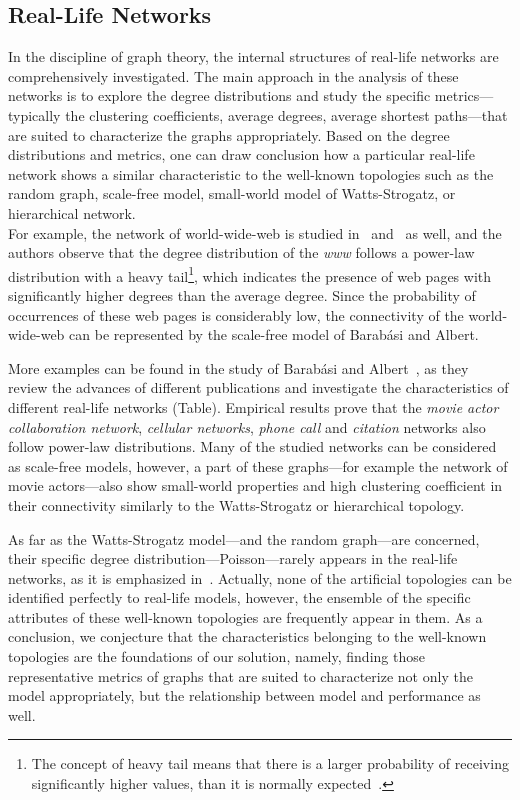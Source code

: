 \subsection{Real-Life Networks}

In the discipline of graph theory, the internal structures of real-life networks are comprehensively investigated. The main approach in the analysis of these networks is to explore the degree distributions and study the specific metrics---typically the clustering coefficients, average degrees, average shortest paths---that are suited to characterize the graphs appropriately. Based on the degree distributions and metrics, one can draw conclusion how a particular real-life network shows a similar characteristic to the well-known topologies such as the random graph, scale-free model, small-world model of Watts-Strogatz, or hierarchical network.\\
For example, the network of world-wide-web is studied in~\cite{www1} and~\cite{www2} as well, and the authors observe that the degree distribution of the \textit{www} follows a power-law distribution with a heavy tail\footnote{The concept of heavy tail means that there is a larger probability of receiving significantly higher values, than it is normally expected~\cite{heavy_tail}.}, which indicates the presence of web pages with significantly higher degrees than the average degree. Since the probability of occurrences of these web pages is considerably low, the connectivity of the world-wide-web can be represented by the scale-free model of Barabási and Albert.


More examples can be found in the study of Barabási and Albert~\cite{statistical_mechanics}, as they review the advances of different publications and investigate the characteristics of different real-life networks (Table). Empirical results prove that the \textit{movie actor collaboration network}, \textit{cellular networks}, \textit{phone call} and \textit{citation} networks also follow power-law distributions. Many of the studied networks can be considered as scale-free models, however, a part of these graphs---for example the network of movie actors---also show small-world properties and high clustering coefficient in their connectivity similarly to the Watts-Strogatz or hierarchical topology.

As far as the Watts-Strogatz model---and the random graph---are concerned, their specific degree distribution---Poisson---rarely appears in the real-life networks, as it is emphasized in~\cite{random_study}. Actually, none of the artificial topologies can be identified perfectly to real-life models, however, the ensemble of the specific attributes of these well-known topologies are frequently appear in them. As a conclusion, we conjecture that the characteristics belonging to the well-known topologies are the foundations of our solution, namely, finding those representative metrics of graphs that are suited to characterize not only the model appropriately, but the relationship between model and performance as well.

